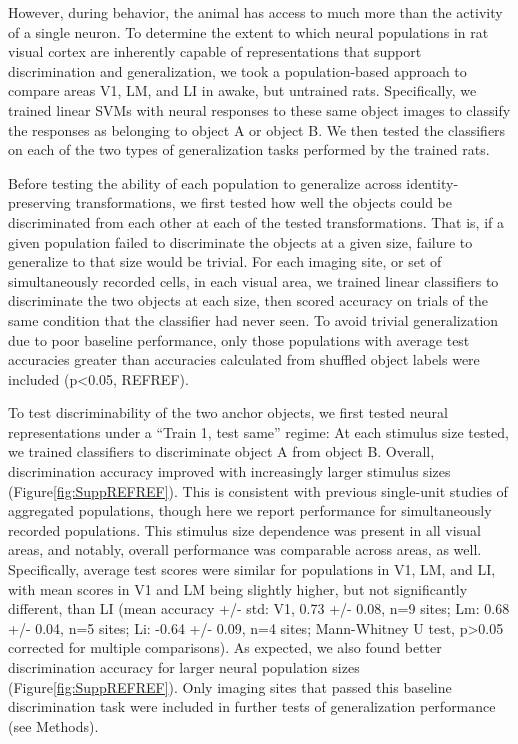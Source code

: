 However, during behavior, the animal has access to much more than the activity of a single neuron. To determine the extent to which neural populations in rat visual cortex are inherently capable of representations that support discrimination and generalization, we took a population-based approach to compare areas V1, LM, and LI in awake, but untrained rats. Specifically, we trained linear SVMs with neural responses to these same object images to classify the responses as belonging to object A or object B\cite{Hung2005, Li2009, Rust2010, etc}. We then tested the classifiers on each of the two types of generalization tasks performed by the trained rats. 

Before testing the ability of each population to generalize across identity-preserving transformations, we first tested how well the objects could be discriminated from each other at each of the tested transformations. That is, if a given population failed to discriminate the objects at a given size, failure to generalize to that size would be trivial. For each imaging site, or set of simultaneously recorded cells, in each visual area, we trained linear classifiers to discriminate the two objects at each size, then scored accuracy on trials of the same condition that the classifier had never seen. To avoid trivial generalization due to poor baseline performance, only those populations with average test accuracies greater than accuracies calculated from shuffled object labels were included (p<0.05, REFREF). 

To test discriminability of the two anchor objects, we first tested neural representations under a “Train 1, test same” regime: At each stimulus size tested, we trained classifiers to discriminate object A from object B. Overall, discrimination accuracy improved with increasingly larger stimulus sizes (Figure\ref{fig:SuppREFREF}). This is consistent with previous single-unit studies of aggregated populations, though here we report performance for simultaneously recorded populations. This stimulus size dependence was present in all visual areas, and notably, overall performance was comparable across areas, as well. Specifically, average test scores were similar for populations in V1, LM, and LI, with mean scores in V1 and LM being slightly higher, but not significantly different, than LI (mean accuracy +/- std: V1, 0.73 +/- 0.08, n=9 sites; Lm: 0.68 +/- 0.04, n=5 sites; Li: -0.64 +/- 0.09, n=4 sites; Mann-Whitney U test, p>0.05 corrected for multiple comparisons). As expected, we also found better discrimination accuracy for larger neural population sizes (Figure\ref{fig:SuppREFREF}). Only imaging sites that passed this baseline discrimination task were included in further tests of generalization performance (see Methods). 

